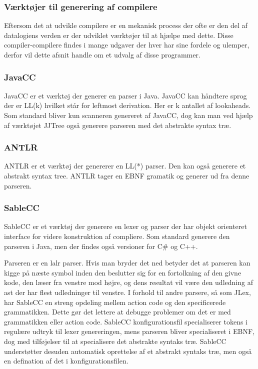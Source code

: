 \subsubsection{Værktøjer til generering af compilere}
\label{ssec:toolsforcc}

Eftersom det at udvikle compilere er en mekanisk process der ofte er den del af datalogiens verden er der udviklet værktøjer til at hjælpe med dette. Disse compiler-compilere findes i mange udgaver der hver har sine fordele og ulemper, derfor vil dette afsnit handle om et udvalg af disse programmer.

\subsubsection{JavaCC}
JavaCC er et værktøj der generer en parser i Java. JavaCC kan håndtere sprog der er LL(k) hvilket står for leftmost derivation. Her er k antallet af lookaheads. Som standard bliver kun scanneren genereret af JavaCC, dog kan man ved hjælp af værktøjet JJTree også generere parseren med det abstrakte syntax træ.

\subsubsection{ANTLR}
ANTLR er et værktøj der genererer en LL(*) parser. Den kan også generere et abstrakt syntax tree. ANTLR tager en EBNF gramatik og generer ud fra denne parseren.

\subsubsection{SableCC}
SableCC er et værktøj der generere en lexer og parser der har objekt orienteret interface for videre konstruktion af compliere. Som standard generere den parseren i Java, men der findes også versioner for C\# og C++.
    
    
\noindent Parseren er en \gls{lalr} parser. Hvis man bryder det ned betyder det at parseren kan kigge på næste symbol inden den beslutter sig for en fortolkning af den givne kode, den læser fra venstre mod højre, og dens resultat vil være den udledning af \gls{ast} der har flest udledninger til venstre.
\noindent I forhold til andre parsere, så som JLex, har SableCC en streng opdeling mellem action code og den specificerede grammatikken. Dette gør det lettere at debugge problemer om det er med grammatikken eller action code.
\noindent SableCC konfigurationsfil specialiserer tokens i regulære udtryk til lexer genereringen, mens parseren bliver specialiseret i EBNF, dog med tilføjelser til at specialisere det abstrakte syntaks træ.
\noindent SableCC understøtter desuden automatisk oprettelse af et abstrakt syntaks træ, men også en defination af det i konfigurationsfilen.